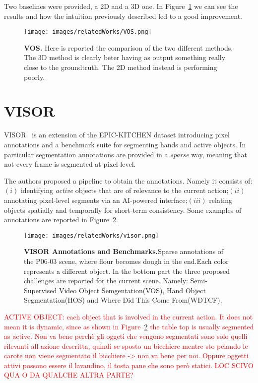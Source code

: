 Two baselines were provided, a 2D and a 3D one. In Figure~\ref{fig:VOS} we can see the results and how the intuition previously described led to a good improvement.
\begin{figure}
    \centering
    \texttt{[image: images/relatedWorks/VOS.png]} 
    \caption{\textbf{VOS.} Here is reported the comparison of the two different methods.
    The 3D method is clearly beter having as output something really close to the groundtruth. The 2D method instead is performing poorly.}\label{fig:VOS}
\end{figure}

\section{VISOR}


VISOR~\cite{visor} is an extension of the EPIC-KITCHEN dataset introducing pixel annotations and a benchmark
suite for segmenting hands and active objects. In particular segmentation annotations are provided in a \textit{sparse} way, meaning
that not every frame is segmented at pixel level.

The authors proposed a pipeline to obtain the annotations. Namely it consists of: $(i)$ identifying \textit{active} objects that are of relevance
to the current action;$(ii)$annotating pixel-level segments via an AI-powered interface;$(iii)$ relating objects spatially and temporally for short-term consistency.
Some examples of annotations are reported in Figure~\ref{fig:visor}.

\begin{figure}
    \centering
    \texttt{[image: images/relatedWorks/visor.png]} 
    \caption{\textbf{VISOR Annotations and Benchmarks.}Sparse annotations of the P06-03 scene, where flour becomes dough in the end.Each color represents a different object.
    In the bottom part the three proposed challenges are reported for the current scene. Namely: Semi-Supervised Video Object Semgentation(VOS),
     Hand Object Segmentation(HOS) and Where Did This Come From(WDTCF).}\label{fig:visor}
\end{figure}

\textcolor{red}{
ACTIVE OBJECT: each object that is involved in the current action. It does not mean it is dynamic, since as shown in Figure~\ref{fig:visor} the table top
is usually segmented as active.
Non va bene perchè gli oggeti che vengono segmentati sono solo quelli rilevanti all azione descritta, quindi se sposto un bicchiere mentre sto pelando 
le carote non viene segmentato il bicchiere -> non va bene per noi. Oppure oggetti attivi possono essere il lavandino, il tosta pane che sono
però statici. LOC SCIVO QUA O DA QUALCHE ALTRA PARTE?}
